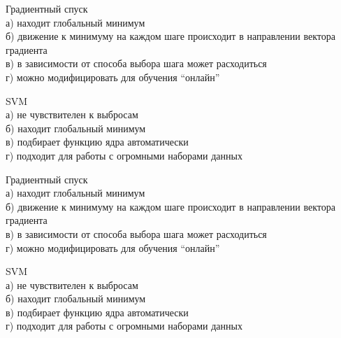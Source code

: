 \documentclass[10pt,a4paper]{article}
\begin{document}
\vspace{2em}
\noindent Градиентный спуск \\
а) находит глобальный минимум \\
б) движение к минимуму на каждом шаге происходит в направлении вектора градиента \\
в) в зависимости от способа выбора шага может расходиться \\
г) можно модифицировать для обучения ``онлайн''

\vspace{1em}
\noindent SVM \\
а) не чувствителен к выбросам \\
б) находит глобальный минимум \\
в) подбирает функцию ядра автоматически \\
г) подходит для работы с огромными наборами данных

\vspace{2em}
\noindent Градиентный спуск \\
а) находит глобальный минимум \\
б) движение к минимуму на каждом шаге происходит в направлении вектора градиента \\
в) в зависимости от способа выбора шага может расходиться \\
г) можно модифицировать для обучения ``онлайн''

\vspace{1em}
\noindent SVM \\
а) не чувствителен к выбросам \\
б) находит глобальный минимум \\
в) подбирает функцию ядра автоматически \\
г) подходит для работы с огромными наборами данных
\end{document}
